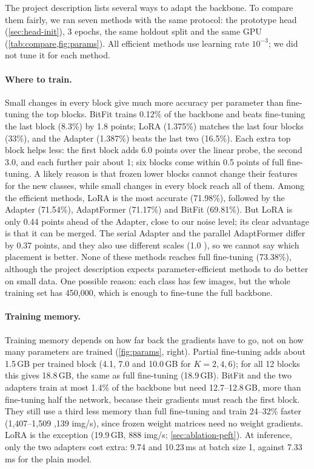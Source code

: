 The project description lists several ways to adapt the backbone.
To compare them fairly, we ran seven methods with the same protocol: the prototype head (\cref{sec:head-init}), 3 epochs, the same holdout split and the same GPU (\cref{tab:compare,fig:params}).
All efficient methods use learning rate $10^{-3}$; we did not tune it for each method.

\paragraph{Where to train.}
Small changes in every block give much more accuracy per parameter than fine-tuning the top blocks.
BitFit trains 0.12\% of the backbone and beats fine-tuning the last block (8.3\%) by 1.8 points; LoRA (1.375\%) matches the last four blocks (33\%), and the Adapter (1.387\%) beats the last two (16.5\%).
Each extra top block helps less: the first block adds 6.0 points over the linear probe, the second 3.0, and each further pair about 1; six blocks come within 0.5 points of full fine-tuning.
A likely reason is that frozen lower blocks cannot change their features for the new classes, while small changes in every block reach all of them.
Among the efficient methods, LoRA is the most accurate (71.98\%), followed by the Adapter (71.54\%), AdaptFormer (71.17\%) and BitFit (69.81\%).
But LoRA is only 0.44 points ahead of the Adapter, close to our noise level; its clear advantage is that it can be merged.
The serial Adapter and the parallel AdaptFormer differ by 0.37 points, and they also use different scales (1.0 ), so we cannot say which placement is better.
None of these methods reaches full fine-tuning (73.38\%), although the project description expects parameter-efficient methods to do better on small data.
One possible reason: each class has few images, but the whole training set has 450,000, which is enough to fine-tune the full backbone.

\paragraph{Training memory.}
Training memory depends on how far back the gradients have to go, not on how many parameters are trained (\cref{fig:params}, right).
Partial fine-tuning adds about 1.5\,GB per trained block (4.1, 7.0 and 10.0\,GB for $K = 2, 4, 6$); for all 12 blocks this gives 18.8\,GB, the same as full fine-tuning (18.9\,GB).
BitFit and the two adapters train at most 1.4\% of the backbone but need 12.7--12.8\,GB, more than fine-tuning half the network, because their gradients must reach the first block.
They still use a third less memory than full fine-tuning and train 24--32\% faster (1,407--1,509 ,139 img/s), since frozen weight matrices need no weight gradients.
LoRA is the exception (19.9\,GB, 888 img/s; \cref{sec:ablation-peft}).
At inference, only the two adapters cost extra: 9.74 and 10.23\,ms at batch size 1, against 7.33\,ms for the plain model.

